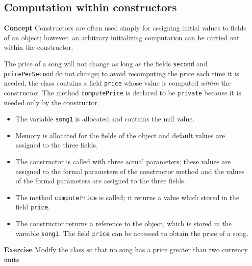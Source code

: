 \subsection{Computation within constructors}\label{con.02}

\textbf{Concept} Constructors are often used simply for assigning initial values to fields of an object; however, an arbitrary initializing computation can be carried out within the constructor.


The price of a song will not change as long as the fields \texttt{second} and
\texttt{pricePerSecond} do not change; to avoid recomputing the price each time it is needed,
the class contains a field \texttt{price} whose value is computed \emph{within} the
constructor. The method \texttt{computePrice} is declared to be \texttt{private} 
because it is needed only by the constructor.
\begin{itemize}
\item The variable \texttt{song1} is allocated and contains the null value.
\item Memory is allocated for the fields of the object and default values are assigned to the three fields.
\item The constructor is called with three actual parameters; these values are assigned to the formal parameters of the constructor method and the values of the formal parameters are assigned to the three fields.
\item The method \texttt{computePrice} is called; it returns a value which stored in the field \texttt{price}.
\item The constructor returns a reference to the object, which is stored in the variable \texttt{song1}. The field \texttt{price} can be accessed to obtain the price of a song.
\end{itemize}

\textbf{Exercise}  Modify the class so that no song has a price greater than two 
currency units.
